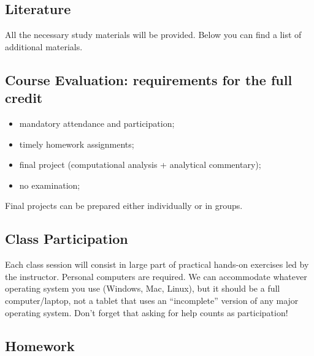 \documentclass[
]{book}
\providecommand{\tightlist}{%
  \setlength{\itemsep}{0pt}\setlength{\parskip}{0pt}}
\begin{document}
\hypertarget{literature}{%
\subsection*{Literature}\label{literature}}

All the necessary study materials will be provided. Below you can find a list of additional materials.

\hypertarget{course-evaluation-requirements-for-the-full-credit}{%
\subsection*{Course Evaluation: requirements for the full credit}\label{course-evaluation-requirements-for-the-full-credit}}

\begin{itemize}
\tightlist
\item
  mandatory attendance and participation;
\item
  timely homework assignments;
\item
  final project (computational analysis + analytical commentary);
\item
  no examination;
\end{itemize}

Final projects can be prepared either individually or in groups.

\hypertarget{class-participation}{%
\subsection*{Class Participation}\label{class-participation}}

Each class session will consist in large part of practical hands-on exercises led by the instructor. Personal computers are required. We can accommodate whatever operating system you use (Windows, Mac, Linux), but it should be a full computer/laptop, not a tablet that uses an ``incomplete'' version of any major operating system. Don't forget that asking for help counts as participation!

\hypertarget{homework}{%
\subsection*{Homework}\label{homework}}
\end{document}
